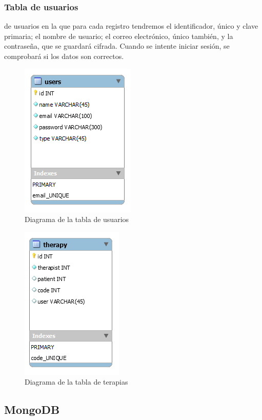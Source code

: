 \subsubsection{Tabla de usuarios}
de usuarios en la que para cada registro tendremos el identificador, único y clave primaria; el nombre de usuario; el correo electrónico, único también, y la contraseña, que se guardará cifrada. Cuando se intente iniciar sesión, se comprobará si los datos son correctos.

\begin{figure}[h]
	\centering
	\includegraphics[scale=1.0]{Imagenes/Vectorial/diagrama_tabla_users}
	\caption{Diagrama de la tabla de usuarios}
	\label{fig:diagramatablausers}
\end{figure}

\begin{figure}[h]
	\centering
	\includegraphics[scale=1.0]{Imagenes/Vectorial/diagrama_tabla_therapy}
	\caption{Diagrama de la tabla de terapias}
	\label{fig:diagramatablatherapy}
\end{figure}


\subsection{MongoDB}



